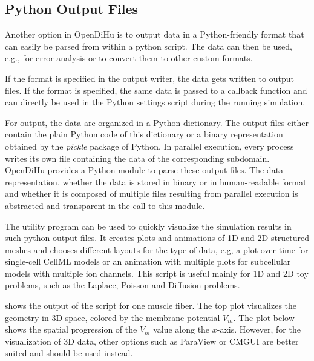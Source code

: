 \subsection{Python Output Files}
Another option in OpenDiHu is to output data in a Python-friendly format that can easily be parsed from within a python script.
The data can then be used, e.g., for error analysis or to convert them to other custom formats.

If the format  is specified in the output writer, the data gets written to output files. If the format  is specified, the same data is passed to a callback function and can directly be used in the Python settings script during the running simulation. 

For output, the data are organized in a Python dictionary. The output files either contain the plain Python code of this dictionary or a binary representation obtained by the \emph{pickle} package of Python. In parallel execution, every process writes its own file containing the data of the corresponding subdomain. OpenDiHu provides a Python module to parse these output files. The data representation, whether the data is stored in binary or in human-readable format and whether it is composed of multiple files resulting from parallel execution is abstracted and transparent in the call to this module.

The utility program  can be used to quickly visualize the simulation results in such python output files. It creates plots and animations of 1D and 2D structured meshes and chooses different layouts for the type of data, e.g, a plot over time for single-cell CellML models or an animation with multiple plots for subcellular models with multiple ion channels. This script is useful mainly for 1D and 2D toy problems, such as the Laplace, Poisson and Diffusion problems.

 shows the output of the  script for one muscle fiber. The top plot visualizes the geometry in 3D space, colored by the membrane potential $V_m$. The plot below shows the spatial progression of the $V_m$ value along the $x$-axis. However, for the visualization of 3D data, other options such as ParaView or CMGUI are better suited and should be used instead.

